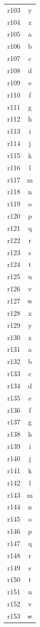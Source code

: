 \documentclass[12pt]{article}
\begin{document}
\begin{longtable}{lc}
r103 & y\\
r104 & z\\
r105 & a\\
r106 & b\\
r107 & c\\
r108 & d\\
r109 & e\\
r110 & f\\
r111 & g\\
r112 & h\\
r113 & i\\
r114 & j\\
r115 & k\\
r116 & l\\
r117 & m\\
r118 & n\\
r119 & o\\
r120 & p\\
r121 & q\\
r122 & r\\
r123 & s\\
r124 & t\\
r125 & u\\
r126 & v\\
r127 & w\\
r128 & x\\
r129 & y\\
r130 & z\\
r131 & a\\
r132 & b\\
r133 & c\\
r134 & d\\
r135 & e\\
r136 & f\\
r137 & g\\
r138 & h\\
r139 & i\\
r140 & j\\
r141 & k\\
r142 & l\\
r143 & m\\
r144 & n\\
r145 & o\\
r146 & p\\
r147 & q\\
r148 & r\\
r149 & s\\
r150 & t\\
r151 & u\\
r152 & v\\
r153 & w\\

\end{longtable}
\end{document}
